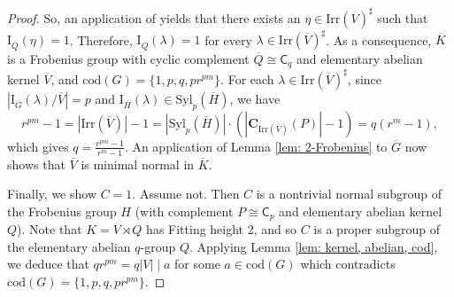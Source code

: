 \documentclass[9pt]{article}
\begin{document}
\begin{proof}
	So, an application of \cite[\S 19, Lemma 19.16]{huppertcharactertheory} yields that there exists an $\eta\in \mathrm{Irr}(\overline{V})^\sharp$ such that $\mathrm{I}_{\overline{Q}}(\eta)=1$.
    Therefore, $\mathrm{I}_{\overline{Q}}(\lambda)=1$ for every $\lambda\in \mathrm{Irr}(\overline{V})^\sharp$.
	As a consequence,
	$\overline{K}$ is a Frobenius group with cyclic complement $\overline{Q}\cong \mathsf{C}_{q}$ and elementary abelian kernel $\overline{V}$, and $\mathrm{cod}(G)=\{ 1,p,q,pr^{pm} \}$.
	 For each $\lambda\in \mathrm{Irr}(\overline{V})^\sharp$,
	since $|\mathrm{I}_{\overline{G}}(\lambda)/\overline{V}|=p$ and $\mathrm{I}_{\overline{H}}(\lambda)\in \mathrm{Syl}_{p}(\overline{H})$,
	we have
	$$r^{pm}-1=|\mathrm{Irr}(\overline{V})|-1=|\mathrm{Syl}_p(\overline{H})|\cdot 
	(|\mathbf{C}_{\mathrm{Irr}(\overline{V})}(P)|-1)=q(r^m-1),$$
    which gives $q=\frac{r^{pm}-1}{r^{m}-1}$.
    An application of Lemma \ref{lem: 2-Frobenius} to $\overline{G}$ now shows that $\overline{V}$
	is minimal normal in $\overline{K}$. 



	Finally, we show $C=1$. 
    Assume not.
    Then $C$ is a nontrivial normal subgroup of the Frobenius group $H$ 
	(with complement $P\cong \mathsf{C}_{p}$ and elementary abelian kernel $Q$).
    Note that $K=V \rtimes Q$ has Fitting height 2, 
	and so $C$ is a proper subgroup of the elementary abelian $q$-group $Q$.
    Applying Lemma \ref{lem: kernel, abelian, cod},
	we deduce that $qr^{pm}=q|V|\mid a$ for some $a\in \mathrm{cod}(G)$
	which contradicts $\mathrm{cod}(G)=\{ 1,p,q,pr^{pm} \}$.
\end{proof}
\end{document}
